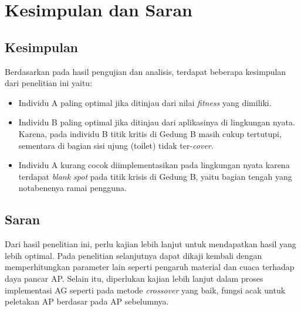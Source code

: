 \documentclass[12pt,a4paper]{report}
\begin{document}
		\chapter{Kesimpulan dan Saran}
		\section{Kesimpulan}
		Berdasarkan pada hasil pengujian dan analisis, terdapat beberapa kesimpulan dari penelitian ini yaitu:
		\begin{itemize}
			\item Individu A paling optimal jika ditinjau dari nilai \emph{fitness} yang dimiliki.
			\item Individu B paling optimal jika ditinjau dari aplikasinya di lingkungan nyata. Karena, pada individu B titik kritis di Gedung B masih cukup tertutupi, sementara di bagian sisi ujung (toilet) tidak ter-\emph{cover}.
			\item Individu A kurang cocok diimplementasikan pada lingkungan nyata karena terdapat \emph{blank spot} pada titik krisis di Gedung B, yaitu bagian tengah yang notabenenya ramai pengguna.
		\end{itemize}
		\section{Saran}
		Dari hasil penelitian ini, perlu kajian lebih lanjut untuk mendapatkan hasil yang lebih optimal. Pada penelitian selanjutnya dapat dikaji kembali dengan memperhitungkan parameter lain seperti pengaruh material dan cuaca terhadap daya pancar AP. Selain itu, diperlukan kajian lebih lanjut dalam proses implementasi AG seperti pada metode \emph{crossover} yang baik, fungsi acak untuk peletakan AP berdasar pada AP sebelumnya.
		
		
\end{document}

